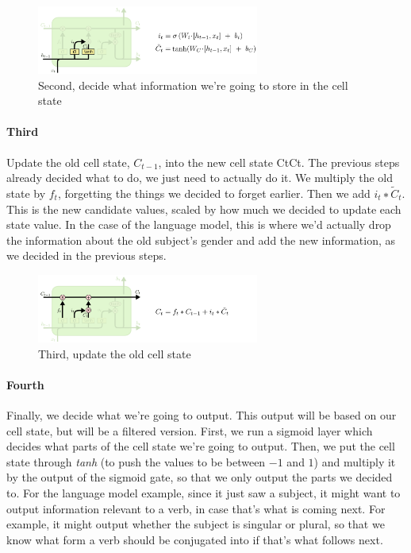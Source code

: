 \begin{figure}[h]
  \centering
  \includegraphics[width=0.65\textwidth]{Images/recurrent_neural_networks/21.png}
  \caption{Second, decide what information we’re going to store in the cell state}
\end{figure}

\paragraph*{Third} Update the old cell state, $C_{t-1}$, into the new cell state CtCt. The previous steps already decided what to do, we just need to actually do it. We multiply the old state by $f_t$, forgetting the things we decided to forget earlier. Then we add $i_t∗\widetilde{C}_t$. This is the new candidate values, scaled by how much we decided to update each state value. In the case of the language model, this is where we’d actually drop the information about the old subject’s gender and add the new information, as we decided in the previous steps.

\begin{figure}[h]
  \centering
  \includegraphics[width=0.65\textwidth]{Images/recurrent_neural_networks/22.png}
  \caption{Third, update the old cell state}
\end{figure}

\paragraph*{Fourth} Finally, we decide what we’re going to output. This output will be based on our cell state, but will be a filtered version. First, we run a sigmoid layer which decides what parts of the cell state we’re going to output. Then, we put the cell state through \textit{tanh} (to push the values to be between $-1$ and $1$) and multiply it by the output of the sigmoid gate, so that we only output the parts we decided to. For the language model example, since it just saw a subject, it might want to output information relevant to a verb, in case that’s what is coming next. For example, it might output whether the subject is singular or plural, so that we know what form a verb should be conjugated into if that’s what follows next.

